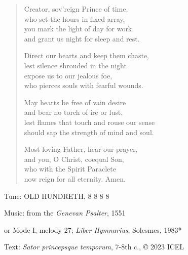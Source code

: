 \hymn

\begin{verse}
Creator, sov’reign Prince of time,\\
who set the hours in fixed array,\\
you mark the light of day for work\\
and grant us night for sleep and rest.

Direct our hearts and keep them chaste,\\
lest silence shrouded in the night\\
expose us to our jealous foe,\\
who pierces souls with fearful wounds.

May hearts be free of vain desire\\
and bear no torch of ire or lust,\\
lest flames that touch and rouse our sense\\
should sap the strength of mind and soul.

Most loving Father, hear our prayer,\\
and you, O Christ, coequal Son,\\
who with the Spirit Paraclete\\
now reign for all eternity. Amen.
\end{verse}

\begin{hymnsource}
Tune: OLD HUNDRETH, 8 8 8 8

Music: from the \emph{Genevan Psalter}, 1551

or Mode I, melody 27; \emph{Liber Hymnarius}, Solesmes, 1983*

Text: \emph{Sator princepsque temporum}, 7-8th c., © 2023 ICEL
\end{hymnsource}